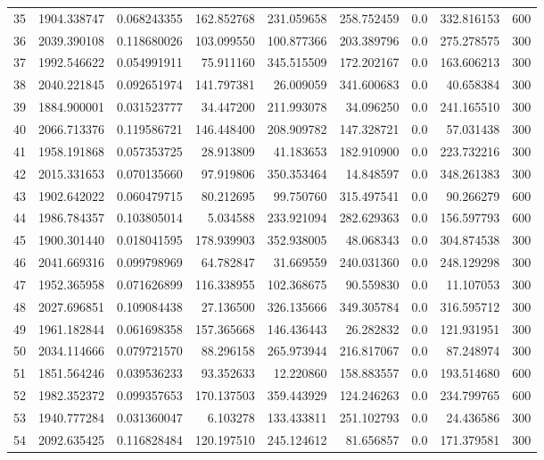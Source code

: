 \begin{longtable}{rrrrrrrrr}
35 & 1904.338747 & 0.068243355 & 162.852768 & 231.059658 & 258.752459 & 0.0 & 332.816153 & 600 \\
36 & 2039.390108 & 0.118680026 & 103.099550 & 100.877366 & 203.389796 & 0.0 & 275.278575 & 300 \\
37 & 1992.546622 & 0.054991911 & 75.911160 & 345.515509 & 172.202167 & 0.0 & 163.606213 & 300 \\
38 & 2040.221845 & 0.092651974 & 141.797381 & 26.009059 & 341.600683 & 0.0 & 40.658384 & 300 \\
39 & 1884.900001 & 0.031523777 & 34.447200 & 211.993078 & 34.096250 & 0.0 & 241.165510 & 300 \\
40 & 2066.713376 & 0.119586721 & 146.448400 & 208.909782 & 147.328721 & 0.0 & 57.031438 & 300 \\
41 & 1958.191868 & 0.057353725 & 28.913809 & 41.183653 & 182.910900 & 0.0 & 223.732216 & 300 \\
42 & 2015.331653 & 0.070135660 & 97.919806 & 350.353464 & 14.848597 & 0.0 & 348.261383 & 300 \\
43 & 1902.642022 & 0.060479715 & 80.212695 & 99.750760 & 315.497541 & 0.0 & 90.266279 & 600 \\
44 & 1986.784357 & 0.103805014 & 5.034588 & 233.921094 & 282.629363 & 0.0 & 156.597793 & 600 \\
45 & 1900.301440 & 0.018041595 & 178.939903 & 352.938005 & 48.068343 & 0.0 & 304.874538 & 300 \\
46 & 2041.669316 & 0.099798969 & 64.782847 & 31.669559 & 240.031360 & 0.0 & 248.129298 & 300 \\
47 & 1952.365958 & 0.071626899 & 116.338955 & 102.368675 & 90.559830 & 0.0 & 11.107053 & 300 \\
48 & 2027.696851 & 0.109084438 & 27.136500 & 326.135666 & 349.305784 & 0.0 & 316.595712 & 300 \\
49 & 1961.182844 & 0.061698358 & 157.365668 & 146.436443 & 26.282832 & 0.0 & 121.931951 & 300 \\
50 & 2034.114666 & 0.079721570 & 88.296158 & 265.973944 & 216.817067 & 0.0 & 87.248974 & 300 \\
51 & 1851.564246 & 0.039536233 & 93.352633 & 12.220860 & 158.883557 & 0.0 & 193.514680 & 600 \\
52 & 1982.352372 & 0.099357653 & 170.137503 & 359.443929 & 124.246263 & 0.0 & 234.799765 & 600 \\
53 & 1940.777284 & 0.031360047 & 6.103278 & 133.433811 & 251.102793 & 0.0 & 24.436586 & 300 \\
54 & 2092.635425 & 0.116828484 & 120.197510 & 245.124612 & 81.656857 & 0.0 & 171.379581 & 300 \\

\end{longtable}
